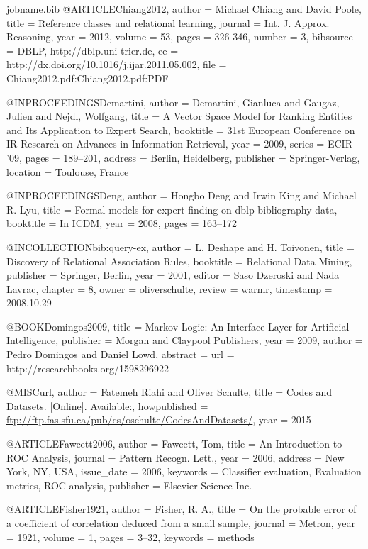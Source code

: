 {\begin{filecontents*}{jobname.bib}
	@ARTICLE{Chiang2012,
		author = {Michael Chiang and David Poole},
		title = {Reference classes and relational learning},
		journal = {Int. J. Approx. Reasoning},
		year = {2012},
		volume = {53},
		pages = {326-346},
		number = {3},
		bibsource = {DBLP, http://dblp.uni-trier.de},
		ee = {http://dx.doi.org/10.1016/j.ijar.2011.05.002},
		file = {Chiang2012.pdf:Chiang2012.pdf:PDF}
	}
	
	@INPROCEEDINGS{Demartini,
		author = {Demartini, Gianluca and Gaugaz, Julien and Nejdl, Wolfgang},
		title = {A Vector Space Model for Ranking Entities and Its Application to
			Expert Search},
		booktitle = {31st European Conference on IR Research on Advances in Information
			Retrieval},
		year = {2009},
		series = {ECIR '09},
		pages = {189--201},
		address = {Berlin, Heidelberg},
		publisher = {Springer-Verlag},
		location = {Toulouse, France}
	}
	
	@INPROCEEDINGS{Deng,
		author = {Hongbo Deng and Irwin King and Michael R. Lyu},
		title = {Formal models for expert finding on dblp bibliography data},
		booktitle = {In ICDM},
		year = {2008},
		pages = {163--172}
	}
	
	@INCOLLECTION{bib:query-ex,
		author = {L. Deshape and H. Toivonen},
		title = {Discovery of Relational Association Rules},
		booktitle = {Relational Data Mining},
		publisher = {Springer, Berlin},
		year = {2001},
		editor = {Saso Dzeroski and Nada Lavrac},
		chapter = {8},
		owner = {oliverschulte},
		review = {warmr},
		timestamp = {2008.10.29}
	}
	
	@BOOK{Domingos2009,
		title = {Markov Logic: An Interface Layer for Artificial Intelligence},
		publisher = {Morgan and Claypool Publishers},
		year = {2009},
		author = {Pedro Domingos and Daniel Lowd},
		abstract = {url = {http://researchbooks.org/1598296922}}
	}
	
	@MISC{url,
		author = {Fatemeh Riahi and Oliver Schulte},
		title = {{Codes and Datasets. [Online].  Available:}},
		howpublished = {\url{ftp://ftp.fas.sfu.ca/pub/cs/oschulte/CodesAndDatasets/}},
		year = {2015}
	}
	
	@ARTICLE{Fawcett2006,
		author = {Fawcett, Tom},
		title = {An Introduction to {ROC} Analysis},
		journal = {Pattern Recogn. Lett.},
		year = {2006},
		address = {New York, NY, USA},
		issue_date = { 2006},
		keywords = {Classifier evaluation, Evaluation metrics, ROC analysis},
		publisher = {Elsevier Science Inc.}
	}
	
	@ARTICLE{Fisher1921,
		author = {Fisher, R. A.},
		title = {{On the probable error of a coefficient of correlation deduced from
				a small sample}},
		journal = {Metron},
		year = {1921},
		volume = {1},
		pages = {3--32},
		keywords = {methods}
	}
	

\end{filecontents*}}
